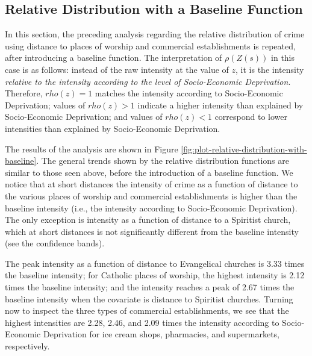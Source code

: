 \documentclass[smallextended]{svjour3}       %
\begin{document}
\hypertarget{relative-distribution-with-a-baseline-function}{%
\subsection{Relative Distribution with a Baseline
Function}\label{relative-distribution-with-a-baseline-function}}

In this section, the preceding analysis regarding the relative
distribution of crime using distance to places of worship and commercial
establishments is repeated, after introducing a baseline function. The
interpretation of \(\rho(Z(s))\) in this case is as follows: instead of
the raw intensity at the value of \(z\), it is the intensity
\emph{relative to the intensity according to the level of Socio-Economic
Deprivation}. Therefore, \(rho(z)=1\) matches the intensity according to
Socio-Economic Deprivation; values of \(rho(z)>1\) indicate a higher
intensity than explained by Socio-Economic Deprivation; and values of
\(rho(z)<1\) correspond to lower intensities than explained by
Socio-Economic Deprivation.

The results of the analysis are shown in Figure
\ref{fig:plot-relative-distribution-with-baseline}. The general trends
shown by the relative distribution functions are similar to those seen
above, before the introduction of a baseline function. We notice that at
short distances the intensity of crime as a function of distance to the
various places of worship and commercial establishments is higher than
the baseline intensity (i.e., the intensity according to Socio-Economic
Deprivation). The only exception is intensity as a function of distance
to a Spiritist church, which at short distances is not significantly
different from the baseline intensity (see the confidence bands).

The peak intensity as a function of distance to Evangelical churches is
3.33 times the baseline intensity; for Catholic places of worship, the
highest intensity is 2.12 times the baseline intensity; and the
intensity reaches a peak of 2.67 times the baseline intensity when the
covariate is distance to Spiritist churches. Turning now to inspect the
three types of commercial establishments, we see that the highest
intensities are 2.28, 2.46, and 2.09 times the intensity according to
Socio-Economic Deprivation for ice cream shops, pharmacies, and
supermarkets, respectively.
\end{document}
